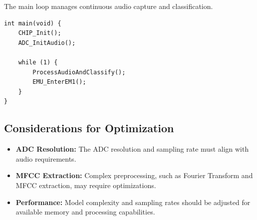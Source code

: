 \documentclass[
  9pt,
  letterpaper,
  abstract,
  titlepage]{scrbook}
\begin{document}
The main loop manages continuous audio capture and classification.

\begin{verbatim}
int main(void) {
    CHIP_Init();
    ADC_InitAudio();

    while (1) {
        ProcessAudioAndClassify();
        EMU_EnterEM1();
    }
}
\end{verbatim}

\subsection{Considerations for
Optimization}\label{considerations-for-optimization}

\begin{itemize}
\item
  \textbf{ADC Resolution:} The ADC resolution and sampling rate must
  align with audio requirements.
\item
  \textbf{MFCC Extraction:} Complex preprocessing, such as Fourier
  Transform and MFCC extraction, may require optimizations.
\item
  \textbf{Performance:} Model complexity and sampling rates should be
  adjusted for available memory and processing capabilities.
\end{itemize}


\backmatter
\end{document}
